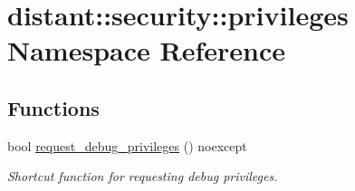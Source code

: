 \hypertarget{namespacedistant_1_1security_1_1privileges}{}\section{distant\+:\+:security\+:\+:privileges Namespace Reference}
\label{namespacedistant_1_1security_1_1privileges}
\subsection*{Functions}
\begin{DoxyCompactItemize}
\item 
bool \mbox{\hyperlink{namespacedistant_1_1security_1_1privileges_a116ee51fe8b7a5cd9e6c190962e1e97f}{request\+\_\+debug\+\_\+privileges}} () noexcept
\begin{DoxyCompactList}\small\item\em Shortcut function for requesting debug privileges. \end{DoxyCompactList}\end{DoxyCompactItemize}

